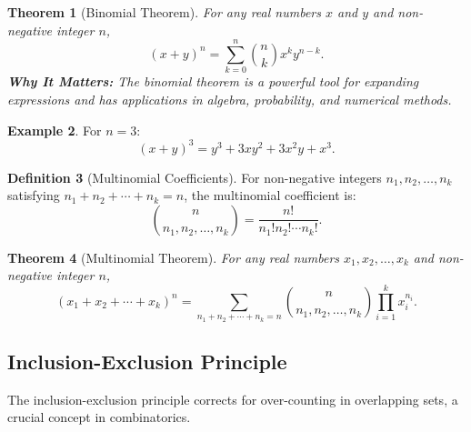 \documentclass[12pt]{article}
\newtheorem{theorem}{Theorem}[section]
\theoremstyle{definition}
\newtheorem{definition}[theorem]{Definition}
\newtheorem{example}[theorem]{Example}
\begin{document}
\begin{center}
\end{center}

\begin{theorem}[Binomial Theorem]
  For any real numbers \(x\) and \(y\) and non-negative integer \(n\),
  \[
  (x+y)^n = \sum_{k=0}^{n} \binom{n}{k} x^k y^{n-k}.
  \]
  \vspace{0.5em}
  \textbf{Why It Matters:} The binomial theorem is a powerful tool for expanding expressions and has applications in algebra, probability, and numerical methods.
\end{theorem}

\begin{example}
  For \(n=3\):
  \[
  (x+y)^3 = y^3 + 3xy^2 + 3x^2y + x^3.
  \]
\end{example}

\begin{definition}[Multinomial Coefficients]
  For non-negative integers \(n_1, n_2, \dots, n_k\) satisfying \(n_1+n_2+\cdots+n_k = n\), the multinomial coefficient is:
  \[
  \binom{n}{n_1, n_2, \dots, n_k} = \frac{n!}{n_1!n_2!\cdots n_k!}.
  \]
\end{definition}

\begin{theorem}[Multinomial Theorem]
  For any real numbers \(x_1, x_2, \dots, x_k\) and non-negative integer \(n\),
  \[
  (x_1+x_2+\cdots+x_k)^n = \sum_{n_1+n_2+\cdots+n_k=n} \binom{n}{n_1, n_2, \dots, n_k} \prod_{i=1}^k x_i^{n_i}.
  \]
\end{theorem}

\subsection{Inclusion-Exclusion Principle}

The inclusion-exclusion principle corrects for over-counting in overlapping sets, a crucial concept in combinatorics.
\end{document}
